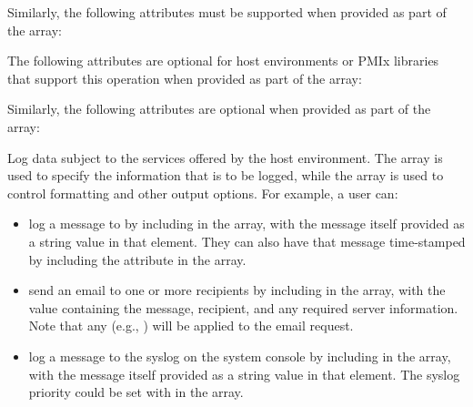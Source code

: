 
Similarly, the following attributes must be supported when provided as part of the  array:


\reqattrend

\optattrstart
The following attributes are optional for host environments or \ac{PMIx} libraries that support this operation when provided as part of the  array:


Similarly, the following attributes are optional when provided as part of the  array:



\optattrend

\descr

Log data subject to the services offered by the host environment. The  array is used to specify the information that is to be logged, while the  array is used to control formatting and other output options. For example, a user can:

\begin{itemize}
\item log a message to  by including  in the  array, with the message itself provided as a string value in that  element. They can also have that message time-stamped by including the  attribute in the  array.
\item send an email to one or more recipients by including  in the  array, with the  value containing the message, recipient, and any required server information. Note that any  (e.g., ) will be applied to the email request.
\item log a message to the syslog on the system console by including  in the  array, with the message itself provided as a string value in that  element. The syslog priority could be set with  in the  array.
\end{itemize}

